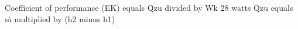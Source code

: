 Coefficient of performance (EK) equals Q̇zu divided by Wk  
28 watts  
Q̇zu equals ṁ multiplied by (h2 minus h1)
